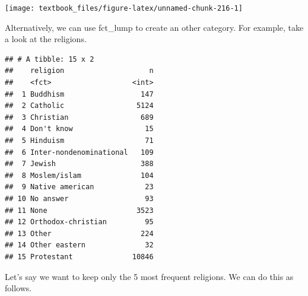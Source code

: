 \documentclass[]{tufte-book}
\newenvironment{Shaded}{}{}
\newcommand{\DataTypeTok}[1]{\textcolor[rgb]{0.56,0.13,0.00}{#1}}
\newcommand{\DecValTok}[1]{\textcolor[rgb]{0.25,0.63,0.44}{#1}}
\newcommand{\KeywordTok}[1]{\textcolor[rgb]{0.00,0.44,0.13}{\textbf{#1}}}
\newcommand{\NormalTok}[1]{#1}
\newcommand{\OperatorTok}[1]{\textcolor[rgb]{0.40,0.40,0.40}{#1}}
\newcommand{\StringTok}[1]{\textcolor[rgb]{0.25,0.44,0.63}{#1}}
\begin{document}
\begin{Shaded}
\end{Shaded}

\texttt{[image: textbook\_files/figure-latex/unnamed-chunk-216-1]}

Alternatively, we can use fct\_lump to create an other category. For example, take a look at the religions.

\begin{Shaded}
\end{Shaded}

\begin{verbatim}
## # A tibble: 15 x 2
##    religion                    n
##    <fct>                   <int>
##  1 Buddhism                  147
##  2 Catholic                 5124
##  3 Christian                 689
##  4 Don't know                 15
##  5 Hinduism                   71
##  6 Inter-nondenominational   109
##  7 Jewish                    388
##  8 Moslem/islam              104
##  9 Native american            23
## 10 No answer                  93
## 11 None                     3523
## 12 Orthodox-christian         95
## 13 Other                     224
## 14 Other eastern              32
## 15 Protestant              10846
\end{verbatim}

Let's say we want to keep only the 5 most frequent religions. We can do this as follows.

\begin{Shaded}
\end{Shaded}
\end{document}
